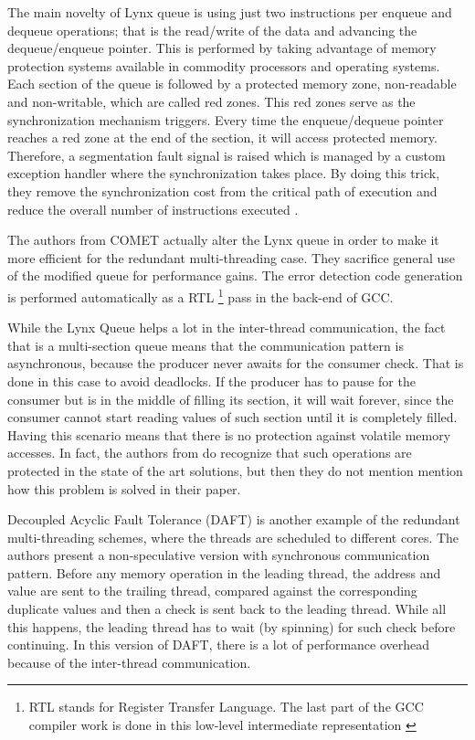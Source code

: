 The main novelty of Lynx queue is using just two instructions per enqueue and dequeue operations; that is the read/write of the data and advancing the dequeue/enqueue pointer. This is performed by taking advantage of memory protection systems available in commodity processors and operating systems. Each section of the queue is followed by a protected memory zone, non-readable and non-writable, which are called red zones. This red zones serve as the synchronization mechanism triggers. Every time the enqueue/dequeue pointer reaches a red zone at the end of the section, it will access protected memory. Therefore, a segmentation fault signal is raised which is managed by a custom exception handler where the synchronization takes place. By doing this trick, they remove the synchronization cost from the critical path of execution and reduce the overall number of instructions executed \cite{mitropoulou2016comet} \cite{mitropoulou2016lynx}. 

The authors from COMET actually alter the Lynx queue in order to make it more efficient for the redundant multi-threading case. They sacrifice general use of the modified queue for performance gains. The error detection code generation is performed automatically as a RTL \footnote{RTL stands for Register Transfer Language. The last part of the GCC compiler work is done in this low-level intermediate representation \cite{GCC}} pass in the back-end of GCC. 

While the Lynx Queue helps a lot in the inter-thread communication, the fact that is a multi-section queue means that the communication pattern is asynchronous, because the producer never awaits for the consumer check. That is done in this case to avoid deadlocks. If the producer has to pause for the consumer but is in the middle of filling its section, it will wait forever, since the consumer cannot start reading values of such section until it is completely filled. Having this scenario means that there is no protection against volatile memory accesses. In fact, the authors from \cite{mitropoulou2016comet} do recognize that such operations are protected in the state of the art solutions, but then they do not mention mention how this problem is solved in their paper.  

Decoupled Acyclic Fault Tolerance (DAFT) \cite{zhang2012daft} is another example of the redundant multi-threading schemes, where the threads are scheduled to different cores. The authors present a non-speculative version with synchronous communication pattern. Before any memory operation in the leading thread, the address and value are sent to the trailing thread, compared against the corresponding duplicate values and then a check is sent back to the leading thread. While all this happens, the leading thread has to wait (by spinning) for such check before continuing. In this version of DAFT, there is a lot of performance overhead because of the inter-thread communication. %

